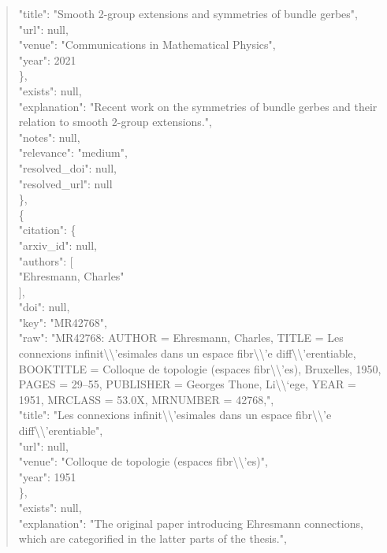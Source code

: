 \documentclass[11pt]{article}
\begin{document}
\begin{quote}
        "title": "Smooth 2-group extensions and symmetries of bundle gerbes",\\
        "url": null,\\
        "venue": "Communications in Mathematical Physics",\\
        "year": 2021\\
      \},\\
      "exists": null,\\
      "explanation": "Recent work on the symmetries of bundle gerbes and their relation to smooth 2-group extensions.",\\
      "notes": null,\\
      "relevance": "medium",\\
      "resolved\_doi": null,\\
      "resolved\_url": null\\
    \},\\
    \{\\
      "citation": \{\\
        "arxiv\_id": null,\\
        "authors": [\\
          "Ehresmann, Charles"\\
        ],\\
        "doi": null,\\
        "key": "MR42768",\\
        "raw": "MR42768: AUTHOR = Ehresmann, Charles, TITLE = Les connexions infinit\textbackslash{}\textbackslash{}'esimales dans un espace fibr\textbackslash{}\textbackslash{}'e diff\textbackslash{}\textbackslash{}'erentiable, BOOKTITLE = Colloque de topologie (espaces fibr\textbackslash{}\textbackslash{}'es), Bruxelles, 1950, PAGES = 29--55, PUBLISHER = Georges Thone, Li\textbackslash{}\textbackslash{}`ege, YEAR = 1951, MRCLASS = 53.0X, MRNUMBER = 42768,",\\
        "title": "Les connexions infinit\textbackslash{}\textbackslash{}'esimales dans un espace fibr\textbackslash{}\textbackslash{}'e diff\textbackslash{}\textbackslash{}'erentiable",\\
        "url": null,\\
        "venue": "Colloque de topologie (espaces fibr\textbackslash{}\textbackslash{}'es)",\\
        "year": 1951\\
      \},\\
      "exists": null,\\
      "explanation": "The original paper introducing Ehresmann connections, which are categorified in the latter parts of the thesis.",\\

\end{quote}
\end{document}
